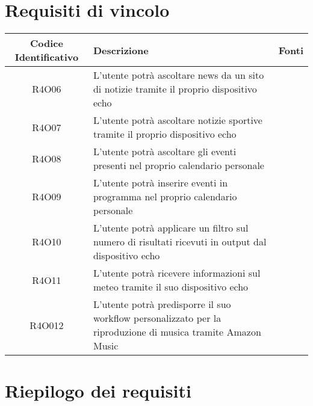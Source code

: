 \section{Requisiti di vincolo}
\begin{tabularx}{\textwidth}{|c|X|X|}
	\hline
	\textbf{Codice Identificativo}& \textbf{Descrizione} & \textbf{Fonti}\\
	\hline	
	\endhead
	R4O06 & L'utente potrà ascoltare news da un sito di notizie tramite il proprio dispositivo echo &\\
	\hline
	R4O07 & L'utente potrà ascoltare notizie sportive tramite il proprio dispositivo echo  &\\
	\hline
	R4O08 & L'utente potrà ascoltare gli eventi presenti nel proprio calendario personale  &\\
	\hline
	R4O09 & L'utente potrà inserire eventi in programma nel proprio calendario personale  &\\
	\hline
	R4O10 & L'utente potrà applicare un filtro sul numero di risultati ricevuti in output dal dispositivo echo &\\
	\hline
	R4O11 & L'utente potrà ricevere informazioni sul meteo tramite il suo dispositivo echo&\\
	\hline
	R4O012& L'utente potrà predisporre il suo workflow personalizzato per la riproduzione di musica tramite Amazon Music &\\
	\hline
\end{tabularx}

\section{Riepilogo dei requisiti}

